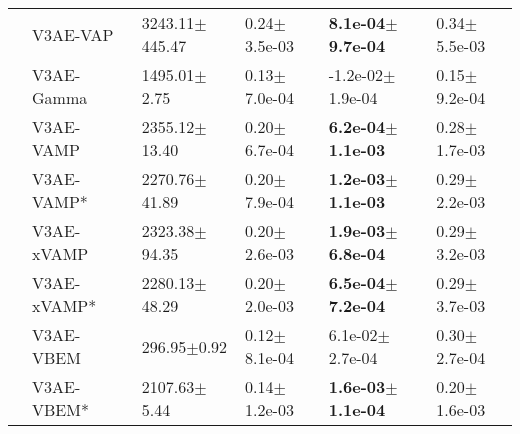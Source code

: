 \begin{tabular}{llllll}
      & V3AE-VAP &           3243.11$\pm$445.47 &              0.24$\pm$3.5e-03 &  \textbf{8.1e-04$\pm$9.7e-04} &              0.34$\pm$5.5e-03 \\
      & V3AE-Gamma &             1495.01$\pm$2.75 &              0.13$\pm$7.0e-04 &          -1.2e-02$\pm$1.9e-04 &              0.15$\pm$9.2e-04 \\
      & V3AE-VAMP &            2355.12$\pm$13.40 &              0.20$\pm$6.7e-04 &  \textbf{6.2e-04$\pm$1.1e-03} &              0.28$\pm$1.7e-03 \\
      & V3AE-VAMP* &            2270.76$\pm$41.89 &              0.20$\pm$7.9e-04 &  \textbf{1.2e-03$\pm$1.1e-03} &              0.29$\pm$2.2e-03 \\
      & V3AE-xVAMP &            2323.38$\pm$94.35 &              0.20$\pm$2.6e-03 &  \textbf{1.9e-03$\pm$6.8e-04} &              0.29$\pm$3.2e-03 \\
      & V3AE-xVAMP* &            2280.13$\pm$48.29 &              0.20$\pm$2.0e-03 &  \textbf{6.5e-04$\pm$7.2e-04} &              0.29$\pm$3.7e-03 \\
      & V3AE-VBEM &              296.95$\pm$0.92 &              0.12$\pm$8.1e-04 &           6.1e-02$\pm$2.7e-04 &              0.30$\pm$2.7e-04 \\
      & V3AE-VBEM* &             2107.63$\pm$5.44 &              0.14$\pm$1.2e-03 &  \textbf{1.6e-03$\pm$1.1e-04} &              0.20$\pm$1.6e-03 \\
\bottomrule
\end{tabular}

